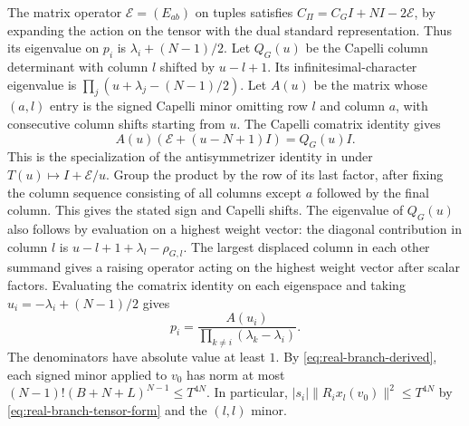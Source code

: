 The matrix operator \(\mathcal E=(E_{ab})\) on tuples satisfies
\(C_{\Pi}=C_G I+NI-2\mathcal E\), by expanding the action on the
tensor with the dual standard representation. Thus its eigenvalue
on \(p_i\) is \(\lambda_i+(N-1)/2\). Let \(Q_G(u)\) be the Capelli
column determinant with column \(l\) shifted by \(u-l+1\). Its
infinitesimal-character eigenvalue is
\(\prod_j(u+\lambda_j-(N-1)/2)\). Let \(A(u)\) be the matrix whose
\((a,l)\) entry is the signed Capelli minor omitting row \(l\) and
column \(a\), with consecutive column shifts starting from \(u\).
The Capelli comatrix identity gives
\[
 A(u)(\mathcal E+(u-N+1)I)=Q_G(u)I .
\]
This is the specialization of the antisymmetrizer identity in
\cite[Proposition~2.7(4), Remarks~2.8(1) and~2.11]{real-branch-mno} under
\(T(u)\mapsto I+\mathcal E/u\). Group the product by the row of
its last factor, after fixing the column sequence consisting of
all columns except \(a\) followed by the final column. This gives
the stated sign and Capelli shifts. The eigenvalue of \(Q_G(u)\)
also follows by evaluation on a highest weight vector: the diagonal
contribution in column \(l\) is \(u-l+1+\lambda_l-\rho_{G,l}\).
The largest displaced column in each other summand gives a raising
operator acting on the highest weight vector after scalar factors.
Evaluating the comatrix identity on each eigenspace and taking
\(u_i=-\lambda_i+(N-1)/2\) gives
\[
 p_i=\frac{A(u_i)}{\prod_{k\ne i}(\lambda_k-\lambda_i)}.
\]
The denominators have absolute value at least \(1\). By
\eqref{eq:real-branch-derived}, each signed minor applied to \(v_0\)
has norm at most \((N-1)!(B+N+L)^{N-1}\le T^{4N}\). In particular,
\(|s_i|\|R_i x_l(v_0)\|^2\le T^{4N}\) by
\eqref{eq:real-branch-tensor-form} and the \((l,l)\) minor.

